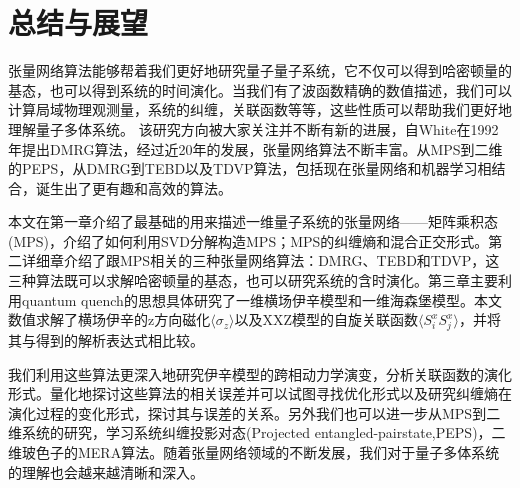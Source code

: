 \documentclass[12pt]{article}
\begin{document}
      \newpage
   {\centering\section{总结与展望}}


   
   张量网络算法能够帮着我们更好地研究量子量子系统，它不仅可以得到哈密顿量的基态，也可以得到系统的时间演化。当我们有了波函数精确的数值描述，我们可以计算局域物理观测量，系统的纠缠，关联函数等等，这些性质可以帮助我们更好地理解量子多体系统。
   该研究方向被大家关注并不断有新的进展，自White在1992年提出DMRG算法，经过近20年的发展，张量网络算法不断丰富。从MPS到二维的PEPS，从DMRG到TEBD以及TDVP算法，包括现在张量网络和机器学习相结合\cite{carleo2017solving}，诞生出了更有趣和高效的算法。
   
   本文在第一章介绍了最基础的用来描述一维量子系统的张量网络——矩阵乘积态(MPS)，介绍了如何利用SVD分解构造MPS；MPS的纠缠熵和混合正交形式。第二详细章介绍了跟MPS相关的三种张量网络算法：DMRG、TEBD和TDVP，这三种算法既可以求解哈密顿量的基态，也可以研究系统的含时演化。第三章主要利用quantum quench的思想具体研究了一维横场伊辛模型和一维海森堡模型。本文数值求解了横场伊辛的z方向磁化$\langle\sigma_z\rangle$以及XXZ模型的自旋关联函数$\langle S_i^x S_j^x\rangle$，并将其与得到的解析表达式相比较。
   
   
   我们利用这些算法更深入地研究伊辛模型的跨相动力学演变，分析关联函数的演化形式。量化地探讨这些算法的相关误差并可以试图寻找优化形式以及研究纠缠熵在演化过程的变化形式，探讨其与误差的关系。另外我们也可以进一步从MPS到二维系统的研究，学习系统纠缠投影对态(Projected entangled-pairstate,PEPS)，二维玻色子的MERA算法。随着张量网络领域的不断发展，我们对于量子多体系统的理解也会越来越清晰和深入。
   \newpage
      
   
   
   
   
   
   
   {\centering}
   
\end{document}
